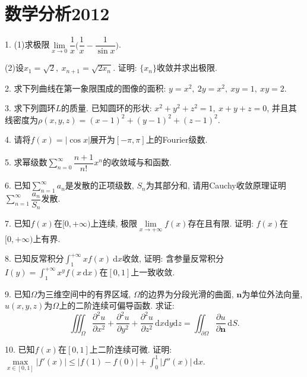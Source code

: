\documentclass[12pt, a4paper, twoside]{ctexart}%
\newcommand{\rmd}{\mathrm{d}} %
\begin{document}
	\section{数学分析2012}
	1. (1)求极限$\lim\limits_{x\rightarrow0}\dfrac{1}{x}\Big(\dfrac{1}{x}-\dfrac{1}{\sin x}\Big)$.\par
	\hspace{1.2em}(2)设$x_1=\sqrt{2},\ x_{n+1}=\sqrt{2x_n}$. 证明: $\{x_n\}$收敛并求出极限. \par
	2. 求下列曲线在第一象限围成的图像的面积: $y=x^2,\ 2y=x^2,\ xy=1,\ xy=2.$\par
	3. 求下列圆环$L$的质量. 已知圆环的形状: $x^2+y^2+z^2=1,\ x+y+z=0$, 并且其线密度为$\rho(x,y,z)=(x-1)^2+(y-1)^2+(z-1)^2.$\par 
	4. 请将$f(x)=|\cos x|$展开为$[-\pi,\pi]$上的Fourier级数. \par
	5. 求幂级数$\sum\limits_{n=0}^{\infty}\dfrac{n+1}{n!}x^n$的收敛域与和函数. \par
	6. 已知$\sum\limits_{n=1}^{\infty}a_n$是发散的正项级数, $S_n$为其部分和, 请用Cauchy收敛原理证明$\sum\limits_{n=1}^{\infty}\dfrac{a_n}{S_n}$发散.\par
	7. 已知$f(x)$在$[0,+\infty)$上连续, 极限$\lim\limits_{x\rightarrow+\infty}f(x)$存在且有限. 证明: $f(x)$在$[0,+\infty)$上有界. \par
	8. 已知反常积分$\int_1^{+\infty}xf(x)\ \rmd x$收敛, 证明: 含参量反常积分$I(y)=\int_1^{+\infty}x^yf(x\,\rmd x)$在$[0,1]$上一致收敛.\par 
	9. 已知$\Omega$为三维空间中的有界区域, $\Omega$的边界为分段光滑的曲面, $\mathbf{n}$为单位外法向量, $u(x,y,z)$为$\Omega$上的二阶连续可偏导函数. 求证:\[
	\iiint_{\Omega}\frac{\partial^2u}{\partial x^2}+\frac{\partial^2u}{\partial y^2}+\frac{\partial^2u}{\partial z^2}\,\rmd x\rmd y\rmd z
	=\iint_{\partial\Omega}\frac{\partial u}{\partial \mathbf{n}}\,\rmd S.\]\par 
	10. 已知$f(x)$在$[0,1]$上二阶连续可微. 证明: $\max\limits_{x\in[0,1]}|f'(x)|\leq|f(1)-f(0)|+\int_0^1|f''(x)|\,\rmd x$. \par 
	\clearpage
\end{document}
